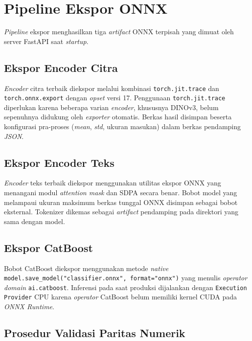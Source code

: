 \section{Pipeline Ekspor ONNX}
\label{sec:onnx-method}

\textit{Pipeline} ekspor menghasilkan tiga \textit{artifact} ONNX terpisah yang dimuat oleh server FastAPI saat \textit{startup}.

\subsection{Ekspor Encoder Citra}

\textit{Encoder} citra terbaik diekspor melalui kombinasi \texttt{torch.jit.trace} dan \texttt{torch.onnx.export} dengan \textit{opset} versi 17. Penggunaan \texttt{torch.jit.trace} diperlukan karena beberapa varian \textit{encoder}, khususnya DINOv3, belum sepenuhnya didukung oleh \textit{exporter} otomatis. Berkas hasil disimpan beserta konfigurasi pra-proses (\textit{mean}, \textit{std}, ukuran masukan) dalam berkas pendamping \textit{JSON}.

\subsection{Ekspor Encoder Teks}

\textit{Encoder} teks terbaik diekspor menggunakan utilitas ekspor ONNX yang menangani modul \textit{attention mask} dan SDPA secara benar. Bobot model yang melampaui ukuran maksimum berkas tunggal ONNX disimpan sebagai bobot eksternal. Tokenizer dikemas sebagai \textit{artifact} pendamping pada direktori yang sama dengan model.

\subsection{Ekspor CatBoost}

Bobot CatBoost diekspor menggunakan metode \textit{native} \texttt{model.save\_model(\allowbreak{}"classifier.onnx",\allowbreak{} format="onnx")} yang menulis \textit{operator domain} \texttt{ai.catboost}. Inferensi pada saat produksi dijalankan dengan \texttt{Execution Provider} CPU karena \textit{operator} CatBoost belum memiliki kernel CUDA pada \textit{ONNX Runtime}.

\subsection{Prosedur Validasi Paritas Numerik}

